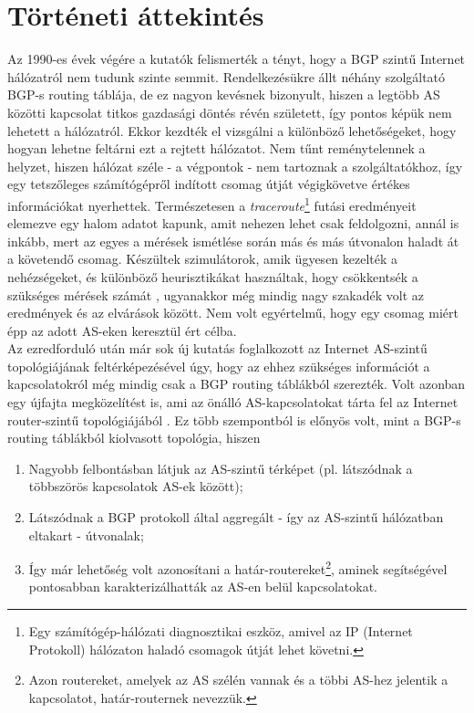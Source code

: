   \section{Történeti áttekintés}\label{sect:section_tortenelem}

  Az 1990-es évek végére a kutatók felismerték a tényt, hogy a BGP szintű Internet hálózatról nem tudunk szinte semmit. Rendelkezésükre állt néhány szolgáltató BGP-s routing táblája, de ez nagyon kevésnek bizonyult, hiszen a legtöbb AS közötti kapcsolat titkos gazdasági döntés révén született, így pontos képük nem lehetett a hálózatról. Ekkor kezdték el vizsgálni a különböző lehetőségeket, hogy hogyan lehetne feltárni ezt a rejtett hálózatot. Nem tűnt reménytelennek a helyzet, hiszen hálózat széle - a végpontok - nem tartoznak a szolgáltatókhoz, így egy tetszőleges számítógépről indított csomag útját végigkövetve értékes információkat nyerhettek. Természetesen a \emph{traceroute}\footnote{Egy számítógép-hálózati diagnosztikai eszköz, amivel az IP (Internet Protokoll) hálózaton haladó csomagok útját lehet követni.} futási eredményeit elemezve egy halom adatot kapunk, amit nehezen lehet csak feldolgozni, annál is inkább, mert az egyes a mérések ismétlése során más és más útvonalon haladt át a követendő csomag. Készültek szimulátorok, amik ügyesen kezelték a nehézségeket, és különböző heurisztikákat használtak, hogy csökkentsék a szükséges mérések számát \cite{Heuristics_for_Internet_Map_Discovery}, ugyanakkor még mindig nagy szakadék volt az eredmények és az elvárások között. Nem volt egyértelmű, hogy egy csomag miért épp az adott AS-eken keresztül ért célba.\\

  Az ezredforduló után már sok új kutatás foglalkozott az Internet AS-szintű topológiájának feltérképezésével úgy, hogy az ehhez szükséges információt a kapcsolatokról még mindig csak a BGP routing táblákból szerezték. Volt azonban egy újfajta megközelítést is, ami az önálló AS-kapcsolatokat tárta fel az Internet router-szintű topológiájából \cite{Inferring_AS_level_Internet_Topology_from_Router_Level_Path_Traces}. Ez több szempontból is előnyös volt, mint a BGP-s routing táblákból kiolvasott topológia, hiszen
  \begin{enumerate}
    \item Nagyobb felbontásban látjuk az AS-szintű térképet (pl. látszódnak a többszörös kapcsolatok AS-ek között);
    \item Látszódnak a BGP protokoll által aggregált - így az AS-szintű hálózatban eltakart - útvonalak;
    \item Így már lehetőség volt azonosítani a határ-routereket\footnote{Azon routereket, amelyek az AS szélén vannak és a többi AS-hez jelentik a kapcsolatot, határ-routernek nevezzük.}, aminek segítségével pontosabban karakterizálhatták az AS-en belül kapcsolatokat.
  \end{enumerate}

